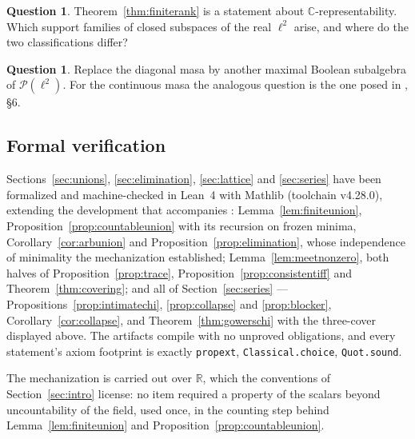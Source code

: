 \documentclass[11pt,reqno]{amsart}
\theoremstyle{definition}
\newtheorem{question}[theorem]{Question}
\newcommand{\C}{\mathbb{C}}
\newcommand{\R}{\mathbb{R}}
\newcommand{\PP}{\mathcal{P}}
\begin{document}
\begin{question}\label{q:realcomplex}
Theorem~\ref{thm:finiterank} is a statement about $\C$-representability. Which
support families of closed subspaces of the real $\ell^2$ arise, and where do
the two classifications differ?
\end{question}

\begin{question}\label{q:otherblocks}
Replace the diagonal masa by another maximal Boolean subalgebra of
$\PP(\ell^2)$. For the continuous masa the analogous question is the one posed
in \cite{FWII}, \S6.
\end{question}

\subsection*{Formal verification}
Sections~\ref{sec:unions}, \ref{sec:elimination}, \ref{sec:lattice} and
\ref{sec:series} have been formalized and machine-checked in Lean~4 with
Mathlib (toolchain v4.28.0), extending the development that accompanies
\cite{FWI,FWII,FWIII,FWIV}: Lemma~\ref{lem:finiteunion},
Proposition~\ref{prop:countableunion} with its recursion on frozen minima,
Corollary~\ref{cor:arbunion} and Proposition~\ref{prop:elimination}, whose
independence of minimality the mechanization established;
Lemma~\ref{lem:meetnonzero}, both halves of Proposition~\ref{prop:trace},
Proposition~\ref{prop:consistentiff} and Theorem~\ref{thm:covering}; and all
of Section~\ref{sec:series} --- Propositions~\ref{prop:intimatechi},
\ref{prop:collapse} and \ref{prop:blocker}, Corollary~\ref{cor:collapse}, and
Theorem~\ref{thm:gowerschi} with the three-cover displayed above. The
artifacts compile with no unproved obligations, and every statement's axiom
footprint is exactly \texttt{propext}, \texttt{Classical.choice},
\texttt{Quot.sound}.

The mechanization is carried out over $\R$, which the conventions of
Section~\ref{sec:intro} license: no item required a property of the scalars
beyond uncountability of the field, used once, in the counting step behind
Lemma~\ref{lem:finiteunion} and Proposition~\ref{prop:countableunion}.
\end{document}
